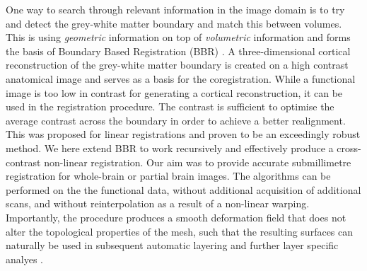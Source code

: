 One way to search through relevant information in the image domain is to try and detect the grey-white matter boundary and match this between volumes. This is using \emph{geometric} information on top of \emph{volumetric} information and forms the basis of Boundary Based Registration (BBR) \cite{Greve2009}. A three-dimensional cortical reconstruction of the grey-white matter boundary is created on a high contrast anatomical image and serves as a basis for the coregistration. While a functional image is too low in contrast for generating a cortical reconstruction, it can be used in the registration procedure. The contrast is sufficient to optimise the average contrast across the boundary in order to achieve a better realignment. This was proposed for linear registrations and proven to be an exceedingly robust method. We here extend BBR to work recursively and effectively produce a cross-contrast non-linear registration. Our aim was to provide accurate submillimetre registration for whole-brain or partial brain images. The algorithms can be performed on the the functional data, without additional acquisition of additional scans, and without reinterpolation as a result of a non-linear warping. Importantly, the procedure produces a smooth deformation field that does not alter the topological properties of the mesh, such that the resulting surfaces can naturally be used in subsequent automatic layering and further layer specific analyes \cite{Waehnert2014,Leprince2015}.
